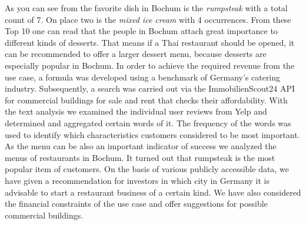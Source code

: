 As you can see from  the favorite dish in Bochum is the \textit{rumpsteak} with a total count of 7. On place two is the \textit{mixed ice cream} with 4 occurrences. From these Top 10 one can read that the people in Bochum attach great importance to different kinds of desserts. That means if a Thai restaurant should be opened, it can be recommended to offer a larger dessert menu, because desserts are especially popular in Bochum.
In order to achieve the required revenue from the use case, a formula was developed using a benchmark of Germany's catering industry. Subsequently, a search was carried out via the ImmobilienScout24 \ac{API} for commercial buildings for sale and rent that checks their affordability.
With the text analysis we examined the individual user reviews from Yelp and determined and aggregated certain words of it. The frequency of the words was used to identify which characteristics customers considered to be most important.
As the menu can be also an important indicator of success we analyzed the menus of restaurants in Bochum. It turned out that rumpsteak is the most popular item of customers. \newline
On the basis of various publicly accessible data, we have given a recommendation for investors in which city in Germany it is advisable to start a restaurant business of a certain kind. We have also considered the financial constraints of the use case and offer suggestions for possible commercial buildings.

